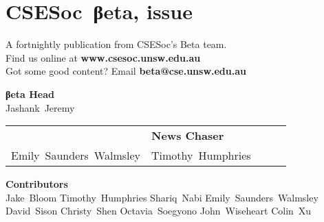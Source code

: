 \documentclass[twoside]{article}
\date{2 September 2015}
\makeatletter
\gdef\the@issue{110}
\makeatother
\begin{document}

\newpage
\maketitle\thispagestyle{mag}
\vspace*{-2em}\section*{CSE{}Soc~βeta, issue \makeatletter\the@issue}
\begin{multicols}{2}\begingroup\raggedcolumns
\begin{center}
A fortnightly publication from CSESoc's Beta team.\\
Find us online at \textbf{www.csesoc.unsw.edu.au}\\
Got some good content? Email \textbf{beta@cse.unsw.edu.au}\\
\par{\bf\sffamily βeta Head}\\ Jashank~Jeremy
\par\begin{tabular}{>{\raggedleft}p{0.5\linewidth}>{\raggedright}p{0.5\linewidth}}
{\bf\sffamily Puzzle Wrangler} & {\bf\sffamily News Chaser}\tabularnewline
Emily~Saunders~Walmsley & Timothy~Humphries\tabularnewline
\end{tabular}
\par{\bf\sffamily Contributors}\\
  Jake~Bloom\hsp{}
  Timothy~Humphries\hsp{}
  Shariq~Nabi\hsp{}
  Emily~Saunders~Walmsley\hsp{}
  David~Sison\hsp{}
  Christy~Shen\hsp{}
  Octavia~Soegyono\hsp{}
  John~Wiseheart\hsp{}
  Colin~Xu\hsp{}
\end{center}
\columnbreak\malcontents\vfill\endgroup
\end{multicols}\LRmulticolcolumns
\vspace*{-4em}\begin{multicols}{2}


\end{multicols}
\end{document}
